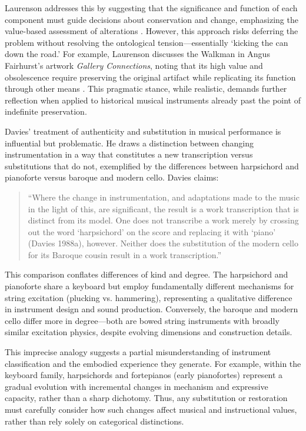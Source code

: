 Laurenson addresses this by suggesting that the significance and function of each component must guide decisions about conservation and change, emphasizing the value-based assessment of alterations \cite{laurenson_management_2005}. However, this approach risks deferring the problem without resolving the ontological tension—essentially `kicking the can down the road.’ For example, Laurenson discusses the Walkman in Angus Fairhurst’s artwork \textit{Gallery Connections}, noting that its high value and obsolescence require preserving the original artifact while replicating its function through other means \cite{laurenson_management_2005}. This pragmatic stance, while realistic, demands further reflection when applied to historical musical instruments already past the point of indefinite preservation.

Davies’ treatment of authenticity and substitution in musical performance \cite{davies_authenticity_2001} is influential but problematic. He draws a distinction between changing instrumentation in a way that constitutes a new transcription versus substitutions that do not, exemplified by the differences between harpsichord and pianoforte versus baroque and modern cello. Davies claims:

\begin{quotation}
    ``Where the change in instrumentation, and adaptations made to the music in the light of this, are significant, the result is a work transcription that is distinct from its model. One does not transcribe a work merely by crossing out the word ‘harpsichord’ on the score and replacing it with ‘piano’ (Davies 1988a), however. Neither does the substitution of the modern cello for its Baroque cousin result in a work transcription.''
\end{quotation}

This comparison conflates differences of kind and degree. The harpsichord and pianoforte share a keyboard but employ fundamentally different mechanisms for string excitation (plucking vs. hammering), representing a qualitative difference in instrument design and sound production. Conversely, the baroque and modern cello differ more in degree—both are bowed string instruments with broadly similar excitation physics, despite evolving dimensions and construction details.

This imprecise analogy suggests a partial misunderstanding of instrument classification and the embodied experience they generate. For example, within the keyboard family, harpsichords and fortepianos (early pianofortes) represent a gradual evolution with incremental changes in mechanism and expressive capacity, rather than a sharp dichotomy. Thus, any substitution or restoration must carefully consider how such changes affect musical and instructional values, rather than rely solely on categorical distinctions.

